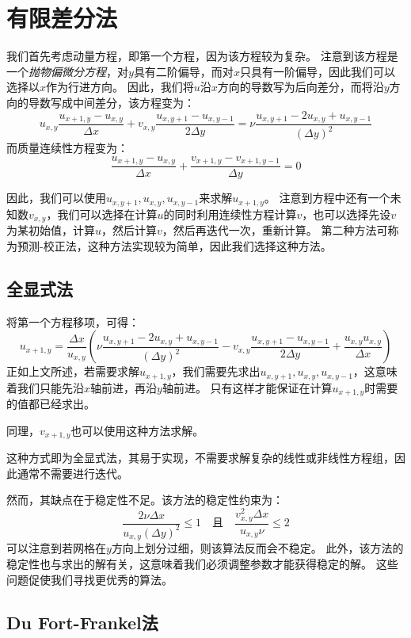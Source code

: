\documentclass[12pt]{ctexart}
\begin{document}
\section{有限差分法}

我们首先考虑动量方程，即第一个方程，因为该方程较为复杂。
注意到该方程是一个\emph{抛物偏微分方程}，对$y$具有二阶偏导，而对$x$只具有一阶偏导，因此我们可以选择以$x$作为行进方向。
因此，我们将$u$沿$x$方向的导数写为后向差分，而将沿$y$方向的导数写成中间差分，该方程变为：
\[ 
    u_{x,y} \frac{u_{x+1, y} - u_{x,y}}{\Delta x} + v_{x,y} \frac{u_{x,y+1} - u_{x,y-1}}{2 \Delta y} = 
    \nu \frac{u_{x,y+1} - 2 u_{x, y} + u_{x,y-1}}{(\Delta y)^2}
\]
而质量连续性方程变为：
\[ \frac{u_{x+1,y} - u_{x,y}}{\Delta x} + \frac{v_{x+1,y} - v_{x+1,y-1}}{\Delta y} = 0 \]

因此，我们可以使用$u_{x,y+1}, u_{x, y}, u_{x,y-1}$来求解$u_{x+1,y}$。
注意到方程中还有一个未知数$v_{x,y}$，我们可以选择在计算$u$的同时利用连续性方程计算$v$，也可以选择先设$v$为某初始值，计算$u$，然后计算$v$，然后再迭代一次，重新计算。
第二种方法可称为预测-校正法，这种方法实现较为简单，因此我们选择这种方法。

\subsection{全显式法}

将第一个方程移项，可得：
\[ 
    u_{x+1,y} = \frac{\Delta x}{u_{x,y}} 
    \left( 
        \nu \frac{u_{x,y+1} - 2 u_{x, y} + u_{x,y-1}}{(\Delta y)^2}  
        - v_{x,y} \frac{u_{x,y+1} - u_{x, y-1}}{2 \Delta y} + \frac{u_{x,y} u_{x,y}}{\Delta x}
    \right) 
\]
正如上文所述，若需要求解$u_{x+1,y}$，我们需要先求出$u_{x,y+1}, u_{x, y}, u_{x,y-1}$，这意味着我们只能先沿$x$轴前进，再沿$y$轴前进。
只有这样才能保证在计算$u_{x+1, y}$时需要的值都已经求出。

同理，$v_{x+1,y}$也可以使用这种方法求解。

这种方式即为全显式法，其易于实现，不需要求解复杂的线性或非线性方程组，因此通常不需要进行迭代。

然而，其缺点在于稳定性不足。该方法的稳定性约束为\cite{book:9105}：
\[ \frac{2\nu \Delta x}{u_{x,y} (\Delta y)^2} \le 1 \quad \text{且} \quad \frac{v_{x,y}^2 \Delta x}{u_{x,y} \nu} \le 2 \]
可以注意到若网格在$y$方向上划分过细，则该算法反而会不稳定。
此外，该方法的稳定性也与求出的解有关，这意味着我们必须调整参数才能获得稳定的解。
这些问题促使我们寻找更优秀的算法。

\subsection{Du Fort-Frankel法}
\end{document}
